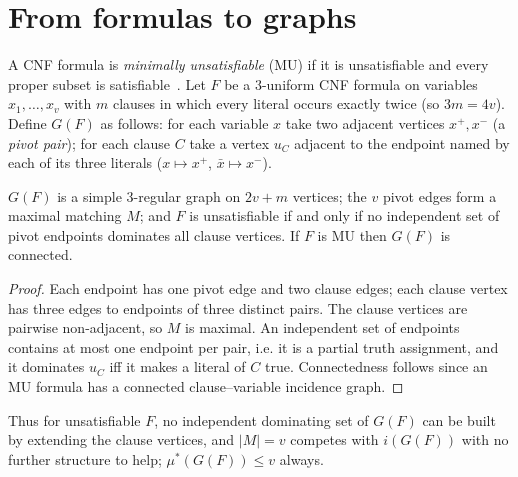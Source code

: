 \documentclass[11pt]{article}
\theoremstyle{remark}\newtheorem{remark}[theorem]{Remark}
\begin{document}
\section{From formulas to graphs}
A CNF formula is \emph{minimally unsatisfiable} (MU) if it is unsatisfiable and every proper subset is satisfiable~\cite{KB}. Let $F$ be a $3$-uniform CNF formula on variables $x_1,\dots,x_v$ with $m$ clauses in which every literal occurs exactly twice (so $3m=4v$). Define $G(F)$ as follows: for each variable $x$ take two adjacent vertices $x^+,x^-$ (a \emph{pivot pair}); for each clause $C$ take a vertex $u_C$ adjacent to the endpoint named by each of its three literals ($x\mapsto x^+$, $\bar x\mapsto x^-$).
\begin{lemma}\label{dict}
$G(F)$ is a simple $3$-regular graph on $2v+m$ vertices; the $v$ pivot edges form a maximal matching $M$; and $F$ is unsatisfiable if and only if no independent set of pivot endpoints dominates all clause vertices. If $F$ is MU then $G(F)$ is connected.
\end{lemma}
\begin{proof}
Each endpoint has one pivot edge and two clause edges; each clause vertex has three edges to endpoints of three distinct pairs. The clause vertices are pairwise non-adjacent, so $M$ is maximal. An independent set of endpoints contains at most one endpoint per pair, i.e. it is a partial truth assignment, and it dominates $u_C$ iff it makes a literal of $C$ true. Connectedness follows since an MU formula has a connected clause--variable incidence graph.
\end{proof}
Thus for unsatisfiable $F$, no independent dominating set of $G(F)$ can be built by extending the clause vertices, and $|M|=v$ competes with $i(G(F))$ with no further structure to help; $\mu^*(G(F))\le v$ always.
\end{document}
